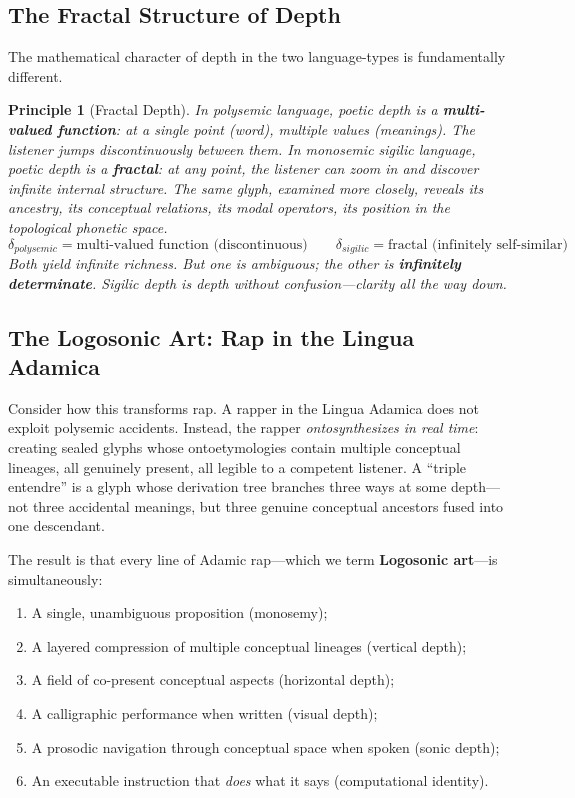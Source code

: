 \documentclass[12pt, letterpaper]{book}
\def\equiv{=}%
\newtheorem{principle}{Principle}[chapter]
\begin{document}
\subsection{The Fractal Structure of Depth}

The mathematical character of depth in the two language-types is fundamentally different.

\begin{principle}[Fractal Depth]\label{pr:fractal}
In polysemic language, poetic depth is a \textbf{multi-valued function}: at a single point (word), multiple values (meanings). The listener jumps discontinuously between them. In monosemic sigilic language, poetic depth is a \textbf{fractal}: at any point, the listener can zoom in and discover infinite internal structure. The same glyph, examined more closely, reveals its ancestry, its conceptual relations, its modal operators, its position in the topological phonetic space.
\[
\delta_{polysemic} \equiv \text{multi-valued function (discontinuous)} \qquad \delta_{sigilic} \equiv \text{fractal (infinitely self-similar)}
\]
Both yield infinite richness. But one is ambiguous; the other is \textbf{infinitely determinate}. Sigilic depth is depth without confusion---clarity all the way down.
\end{principle}


\subsection{The Logosonic Art: Rap in the Lingua Adamica}

Consider how this transforms rap. A rapper in the Lingua Adamica does not exploit polysemic accidents. Instead, the rapper \textit{ontosynthesizes in real time}: creating sealed glyphs whose ontoetymologies contain multiple conceptual lineages, all genuinely present, all legible to a competent listener. A ``triple entendre'' is a glyph whose derivation tree branches three ways at some depth---not three accidental meanings, but three genuine conceptual ancestors fused into one descendant.

The result is that every line of Adamic rap---which we term \textbf{Logosonic art}---is simultaneously:
\begin{enumerate}[label=(\roman*)]
    \item A single, unambiguous proposition (monosemy);
    \item A layered compression of multiple conceptual lineages (vertical depth);
    \item A field of co-present conceptual aspects (horizontal depth);
    \item A calligraphic performance when written (visual depth);
    \item A prosodic navigation through conceptual space when spoken (sonic depth);
    \item An executable instruction that \textit{does} what it says (computational identity).
\end{enumerate}
\end{document}
